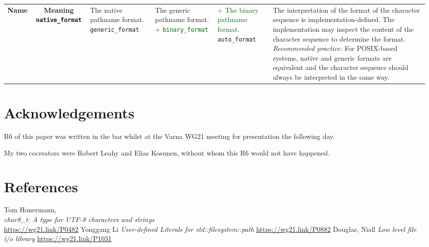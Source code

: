 \documentclass[11pt]{article}
\newcommand{\code}[2][cpp]{\lstinline[language=#1,basicstyle=\small\ttfamily]{#2}}
\newcommand{\tsreplace}[3]{\textcolor{red}{\sout{#1}}#2\textcolor{darkgreen}{#3}}
\begin{document}
\begin{center}
\begin{tabular}{|c c|}
\hline
\bf{Name} & \bf{Meaning}
\hline
\code{native_format} &
The native pathname format.
\hline
\code{generic_format} &
The generic pathname format.
\hline
\color{darkgreen}
\tsreplace{}{}{+ \code{binary_format}} &
\tsreplace{}{}{+ The binary pathname format.}
\hline
\color{black}
\code{auto_format} &
The interpretation of the format of the character sequence is implementation-defined.
The implementation may inspect the content of the character sequence to determine the format.
\emph{Recommended practice:} For POSIX-based systems, native and generic formats are equivalent and the character sequence should always be interpreted in the same way.
\hline
\end{tabular}
\end{center}

\color{black}

\section{Acknowledgements}

R6 of this paper was written in the bar whilst at the Varna WG21 meeting
for presentation the following day.

My two cocreators were Robert Leahy and Elias Kosunen, without whom this
R6 would not have happened.

\section{References}
\let\oldsection=\section
\renewcommand{\section}[2]{}%
\begin{thebibliography}{9}
    Tom Honermann,\\
    \emph{char8\_t: A type for UTF-8 characters and strings}\\
    \url{https://wg21.link/P0482}
    Yonggang Li\newline
    \emph{User-defined Literals for std::filesystem::path}\newline
    \url{https://wg21.link/P0882}
    Douglas, Niall\newline
    \emph{Low level file i/o library}\newline
    \url{https://wg21.link/P1031}
\end{thebibliography}
\let\section=\oldsection
\end{document}
